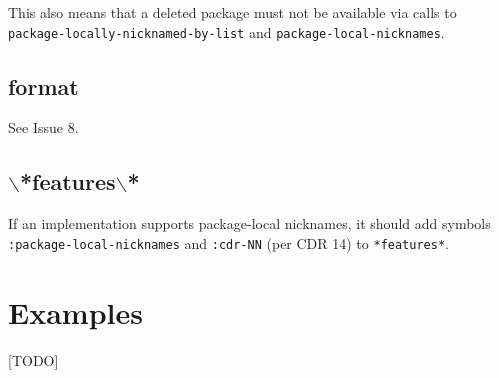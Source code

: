 \documentclass[11pt]{article}
\begin{document}
This also means that a deleted package must not be available via calls to
\texttt{package-locally-nicknamed-by-list} and \texttt{package-local-nicknames}.
\subsection{format}
\label{sec:org854d277}
See Issue 8.
\subsection{$\backslash$*features$\backslash$*}
\label{sec:org228de46}
If an implementation supports package-local nicknames, it should add symbols
\texttt{:package-local-nicknames} and \texttt{:cdr-NN} (per CDR 14) to \texttt{*features*}.
\section{Examples}
\label{sec:org6afc40d}
[TODO]
\end{document}
